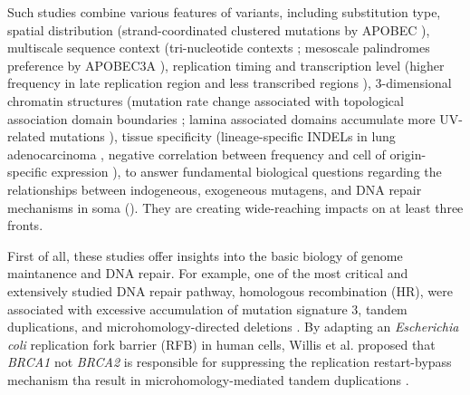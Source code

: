 \documentclass[phd,tocprelim]{cornell}
\begin{document}
Such studies combine various features of variants, including substitution type, spatial distribution (strand-coordinated clustered mutations by APOBEC \cite{Shi2017-cd}), multiscale sequence context (tri-nucleotide contexts \cite{alexandrov2013}; mesoscale palindromes preference by APOBEC3A \cite{Buisson2019-ue}), replication timing and transcription level (higher frequency in late replication region and less transcribed regions \cite{Lawrence2013-zx}), 3-dimensional chromatin structures (mutation rate change associated with topological association domain boundaries \cite{Akdemir2020-hn}; lamina associated domains accumulate more UV-related mutations \cite{Garcia-Nieto2017-ox}), tissue specificity (lineage-specific INDELs in lung adenocarcinoma \cite{imielinski2017}, negative correlation between frequency and cell of origin-specific expression \cite{polak2015}), to answer fundamental biological questions regarding the relationships between indogeneous, exogeneous mutagens, and DNA repair mechanisms in soma (\cite{Zou2021-je,Volkova2020-zg,Vohringer2021-bv}). They are creating wide-reaching impacts on at least three fronts.

First of all, these studies offer insights into the basic biology of genome maintanence and DNA repair. For example, one of the most critical and extensively studied DNA repair pathway, homologous recombination (HR), were associated with excessive accumulation of mutation signature 3, tandem duplications, and microhomology-directed deletions \cite{Nik-Zainal2016-bz}. By adapting an \textit{Escherichia coli} replication fork barrier (RFB) in human cells, Willis et al. proposed that \textit{BRCA1} not \textit{BRCA2} is responsible for suppressing the replication restart-bypass mechanism tha result in microhomology-mediated tandem duplications \cite{Willis2017-bw}.
\end{document}
